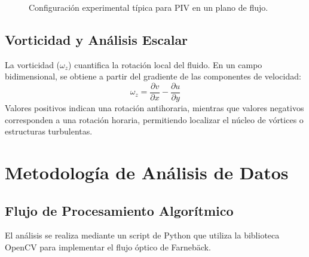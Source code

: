\documentclass[11pt, a4paper]{article}
\begin{document}
\begin{figure}[htbp]
    \centering
    \caption{Configuración experimental típica para PIV en un plano de flujo.}
\end{figure}

\subsection{Vorticidad y Análisis Escalar}
La vorticidad ($\omega_z$) cuantifica la rotación local del fluido. En un campo bidimensional, se obtiene a partir del gradiente de las componentes de velocidad:
\begin{equation}
    \omega_z = \frac{\partial v}{\partial x} - \frac{\partial u}{\partial y}
\end{equation}
Valores positivos indican una rotación antihoraria, mientras que valores negativos corresponden a una rotación horaria, permitiendo localizar el núcleo de vórtices o estructuras turbulentas.

\section{Metodología de Análisis de Datos}

\subsection{Flujo de Procesamiento Algorítmico}
El análisis se realiza mediante un script de Python que utiliza la biblioteca OpenCV para implementar el flujo óptico de Farnebäck.
\end{document}
